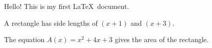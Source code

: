 \documentclass[12pt]{article}
\begin{document}
Hello! This is my first \LaTeX\ document.

A rectangle has side lengths of $(x+1)$ and $(x+3)$.

The equation $A(x) = x^2+4x+3$ gives the area of the rectangle.
\end{document}
